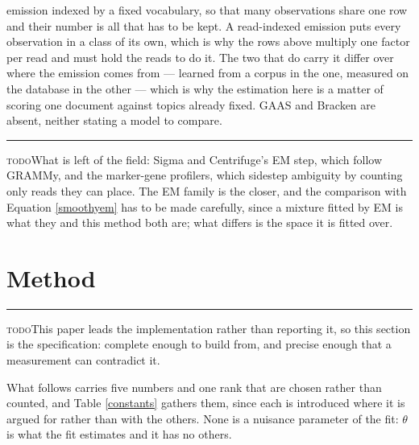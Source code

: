 \documentclass[pdflatex,sn-vancouver-num]{sn-jnl}
\newif\ifshowtodos \showtodostrue
\newcommand{\todo}[1]{%
  \ifshowtodos
    \par\addvspace{0.7\baselineskip}%
    \begin{list}{}{%
      \setlength{\leftmargin}{1.5em}%
      \setlength{\rightmargin}{1.5em}%
      \setlength{\topsep}{0pt}%
      \setlength{\partopsep}{0pt}%
      \setlength{\parsep}{0.5\baselineskip}%
      \setlength{\itemsep}{0pt}%
    }%
    \item[]\footnotesize\color{black!70}%
      \textcolor{orange!65!black}{\rule[-0.2ex]{2pt}{1.15ex}}\hspace{0.55em}%
      \textcolor{orange!65!black}{\textsc{todo}}\hspace{0.6em}\ignorespaces#1%
    \end{list}%
    \addvspace{0.7\baselineskip}%
  \fi%
}
\begin{document}
\begin{table}[!htbp]
{        emission indexed by a fixed vocabulary, so that many observations share one row and their
        number is all that has to be kept. A read-indexed emission puts every observation in a class
        of its own, which is why the rows above multiply one factor per read and must hold the reads
        to do it. The two that do carry it differ over where the emission comes from --- learned
        from a corpus in the one, measured on the database in the other --- which is why the
        estimation here is a matter of scoring one document against topics already fixed. GAAS and
        Bracken are absent, neither stating a model to compare.}\label{modelstructure}
    \end{table}

    \todo{What is left of the field: Sigma and Centrifuge's EM step, which follow GRAMMy, and the
    marker-gene profilers, which sidestep ambiguity by counting only reads they can place. The EM
    family is the closer, and the comparison with Equation \eqref{smoothyem} has to be made carefully,
    since a mixture fitted by EM is what they and this method both are; what differs is the space it
    is fitted over.}

    \section{Method}\label{method}
    \todo{This paper leads the implementation rather than reporting it, so this section is the
    specification: complete enough to build from, and precise enough that a measurement can
    contradict it.}

    What follows carries five numbers and one rank that are chosen rather than counted, and
    Table \ref{constants} gathers them, since each is introduced where it is argued for rather than
    with the others. None is a nuisance parameter of the fit: $\theta$ is what the fit estimates and
    it has no others.
\end{document}
